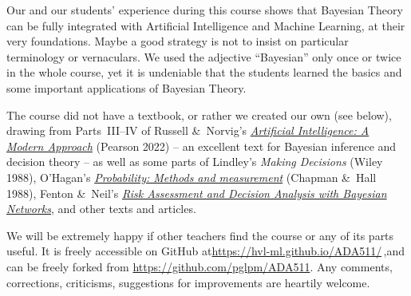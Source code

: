 Our and our students' experience during this course shows that Bayesian Theory can be fully integrated with Artificial Intelligence and Machine Learning, at their very foundations. Maybe a good strategy is not to insist on particular terminology or vernaculars. We used the adjective ``Bayesian'' only once or twice in the whole course, yet it is undeniable that the students learned the basics and some important applications of Bayesian Theory.

The course did not have a textbook, or rather we created our own (see below), drawing from Parts~III--IV of Russell \&\ Norvig's \href{http://aima.cs.berkeley.edu/global-index.html}{\emph{Artificial Intelligence: A Modern Approach}} (Pearson 2022) -- an excellent text for Bayesian inference and decision theory -- as well as some parts of Lindley's \emph{Making Decisions} (Wiley 1988), O'Hagan's \href{https://doi.org/10.1007/978-94-009-1211-3}{\emph{Probability: Methods and measurement}} (Chapman \&\ Hall 1988), Fenton \&\ Neil's \href{https://doi.org/10.1201/b21982}{\emph{Risk Assessment and Decision Analysis with Bayesian Networks}}, and other texts and articles.

\smallskip


We will be extremely happy if other teachers find the course or any of its parts useful. It is freely accessible on GitHub at\enspace \url{https://hvl-ml.github.io/ADA511/}\,,\enspace and can be freely forked from \url{https://github.com/pglpm/ADA511}. Any comments, corrections, criticisms, suggestions for improvements are heartily welcome.

